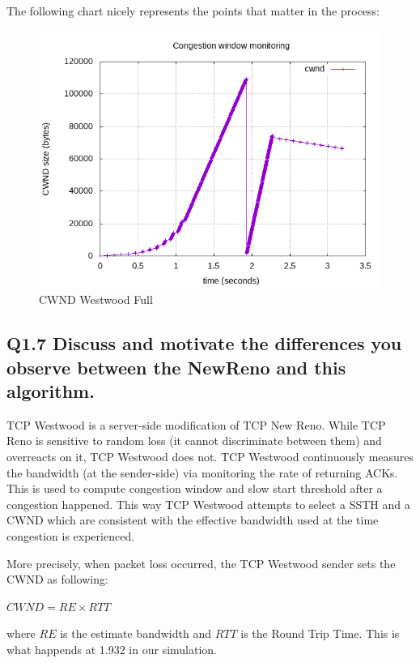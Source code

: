 \documentclass{article}
\begin{document}
The following chart nicely represents the points that matter in the process:

\begin{figure}[h]
    \centering
    \includegraphics[scale=0.6]{images/lab1-group11-task1-question6.png}
    \caption{CWND Westwood Full}
    \label{fig:cwnd_deflation}
\end{figure}



\subsection{Q1.7 Discuss and motivate the differences you observe
between the NewReno and this algorithm.}

TCP Westwood is a server-side modification of TCP New Reno. While TCP Reno is sensitive to random loss (it cannot discriminate between them) and overreacts on it, TCP Westwood does not. TCP Westwood continuously measures the bandwidth (at the sender-side) via monitoring the rate of returning ACKs. This is used to compute congestion window and slow start threshold after a congestion happened. This way TCP Westwood attempts to select a SSTH and a CWND which are consistent with the effective bandwidth used at the time congestion is experienced. \parencite{casetti2002tcp}

More precisely, when packet loss occurred, the TCP Westwood sender sets the CWND as following:

$ CWND = RE \times RTT $

where $ RE $ is the estimate bandwidth and $ RTT $ is the Round Trip Time. This is what happends at 1.932 in our simulation.
\end{document}
